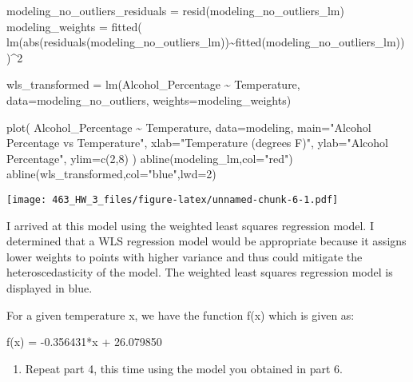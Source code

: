 \documentclass[
]{article}
\newenvironment{Shaded}{\begin{snugshade}}{\end{snugshade}}
\newcommand{\AttributeTok}[1]{\textcolor[rgb]{0.77,0.63,0.00}{#1}}
\newcommand{\DecValTok}[1]{\textcolor[rgb]{0.00,0.00,0.81}{#1}}
\newcommand{\FunctionTok}[1]{\textcolor[rgb]{0.00,0.00,0.00}{#1}}
\newcommand{\NormalTok}[1]{#1}
\newcommand{\OtherTok}[1]{\textcolor[rgb]{0.56,0.35,0.01}{#1}}
\newcommand{\SpecialCharTok}[1]{\textcolor[rgb]{0.00,0.00,0.00}{#1}}
\newcommand{\StringTok}[1]{\textcolor[rgb]{0.31,0.60,0.02}{#1}}
\providecommand{\tightlist}{%
  \setlength{\itemsep}{0pt}\setlength{\parskip}{0pt}}
\begin{document}
\begin{Shaded}
\begin{Highlighting}[]
\NormalTok{modeling\_no\_outliers\_residuals }\OtherTok{=} \FunctionTok{resid}\NormalTok{(modeling\_no\_outliers\_lm)}
\NormalTok{modeling\_weights }\OtherTok{=} \FunctionTok{fitted}\NormalTok{( }\FunctionTok{lm}\NormalTok{(}\FunctionTok{abs}\NormalTok{(}\FunctionTok{residuals}\NormalTok{(modeling\_no\_outliers\_lm))}\SpecialCharTok{\textasciitilde{}}\FunctionTok{fitted}\NormalTok{(modeling\_no\_outliers\_lm)) )}\SpecialCharTok{\^{}}\DecValTok{2}

\NormalTok{wls\_transformed }\OtherTok{=} \FunctionTok{lm}\NormalTok{(Alcohol\_Percentage }\SpecialCharTok{\textasciitilde{}}\NormalTok{ Temperature, }\AttributeTok{data=}\NormalTok{modeling\_no\_outliers, }\AttributeTok{weights=}\NormalTok{modeling\_weights)}

\FunctionTok{plot}\NormalTok{(}
\NormalTok{  Alcohol\_Percentage }\SpecialCharTok{\textasciitilde{}}\NormalTok{ Temperature, }\AttributeTok{data=}\NormalTok{modeling,}
  \AttributeTok{main=}\StringTok{"Alcohol Percentage vs Temperature"}\NormalTok{,}
  \AttributeTok{xlab=}\StringTok{"Temperature (degrees F)"}\NormalTok{,}
  \AttributeTok{ylab=}\StringTok{"Alcohol Percentage"}\NormalTok{,}
  \AttributeTok{ylim=}\FunctionTok{c}\NormalTok{(}\DecValTok{2}\NormalTok{,}\DecValTok{8}\NormalTok{)}
\NormalTok{)}
\FunctionTok{abline}\NormalTok{(modeling\_lm,}\AttributeTok{col=}\StringTok{"red"}\NormalTok{)}
\FunctionTok{abline}\NormalTok{(wls\_transformed,}\AttributeTok{col=}\StringTok{"blue"}\NormalTok{,}\AttributeTok{lwd=}\DecValTok{2}\NormalTok{)}
\end{Highlighting}
\end{Shaded}

\texttt{[image: 463\_HW\_3\_files/figure-latex/unnamed-chunk-6-1.pdf]}

I arrived at this model using the weighted least squares regression
model. I determined that a WLS regression model would be appropriate
because it assigns lower weights to points with higher variance and thus
could mitigate the heteroscedasticity of the model. The weighted least
squares regression model is displayed in blue.

For a given temperature x, we have the function f(x) which is given as:

f(x) = -0.356431*x + 26.079850

\begin{enumerate}
\def\labelenumi{\arabic{enumi})}
\setcounter{enumi}{6}
\tightlist
\item
  Repeat part 4, this time using the model you obtained in part 6.
\end{enumerate}
\end{document}
